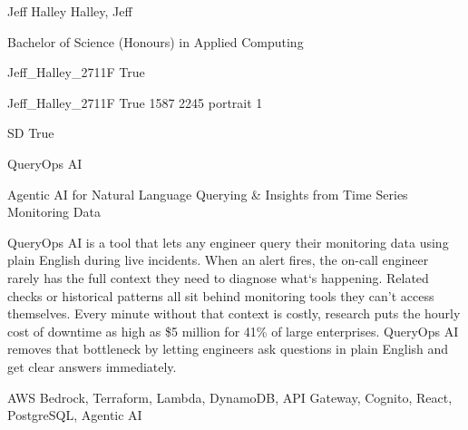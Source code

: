 
\begingroup{}\relax



\def\Key{Jeff_Halley_2711F}

{Jeff Halley}
{Halley, Jeff}

{Bachelor of Science (Honours) in Applied Computing}

{Jeff_Halley_2711F}
{True}

{Jeff_Halley_2711F}
{True}
{1587}
{2245}
{portrait}
{1}

{SD}
{True}

{QueryOps AI}

{Agentic AI for Natural Language Querying \& Insights from Time Series Monitoring Data}

{QueryOps AI is a tool that lets any engineer query their monitoring data using plain English during live incidents. When an alert fires, the on-call engineer rarely has the full context they need to diagnose what\textquoteleft{}s happening. Related checks or historical patterns all sit behind monitoring tools they can\textquoteright{}t access themselves. Every minute without that context is costly, research puts the hourly cost of downtime as high as \$5 million for 41\% of large enterprises. QueryOps AI removes that bottleneck by letting engineers ask questions in plain English and get clear answers immediately.}

{AWS Bedrock, Terraform, Lambda, DynamoDB, API Gateway, Cognito, React, PostgreSQL, Agentic AI}

